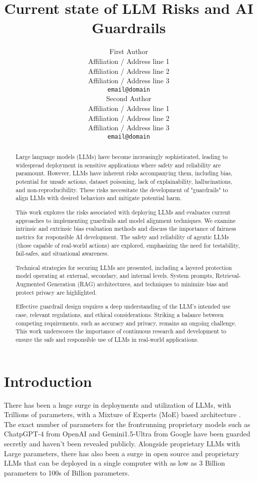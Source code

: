 \documentclass[11pt]{article}
\title{ Current state of LLM Risks and AI Guardrails }
\author{First Author \\
  Affiliation / Address line 1 \\
  Affiliation / Address line 2 \\
  Affiliation / Address line 3 \\
  \texttt{email@domain} \\\And
  Second Author \\
  Affiliation / Address line 1 \\
  Affiliation / Address line 2 \\
  Affiliation / Address line 3 \\
  \texttt{email@domain} \\}
\begin{document}
\maketitle
\begin{abstract}

Large language models (LLMs) have become increasingly sophisticated, leading to widespread deployment in sensitive applications where safety and reliability are paramount.  However, LLMs have inherent risks accompanying them, including bias, potential for unsafe actions, dataset poisoning, lack of explainability, hallucinations, and non-reproducibility. These risks necessitate the development of "guardrails" to align  LLMs with desired behaviors and mitigate potential harm.

This work explores the risks associated with deploying LLMs and evaluates current approaches to implementing guardrails and model alignment techniques. We examine intrinsic and extrinsic bias evaluation methods and discuss the importance of fairness metrics for responsible AI development.  The safety and reliability of agentic LLMs (those capable of real-world actions) are explored, emphasizing the need for testability, fail-safes, and situational awareness.

Technical strategies for securing LLMs are presented, including a layered protection model operating at external, secondary, and internal levels. System prompts, Retrieval-Augmented Generation (RAG) architectures, and techniques to minimize bias and protect privacy are highlighted.

Effective guardrail design requires a deep understanding of the LLM's intended use case, relevant regulations, and ethical considerations. Striking a balance between competing requirements, such as accuracy and privacy, remains an ongoing challenge. This work underscores the importance of continuous research and development to ensure the safe and responsible use of LLMs in real-world applications.

\end{abstract}

\section{Introduction}

There has been a huge surge in deployments and utilization of LLMs, with Trillions of parameters, with a Mixture of Experts (MoE) based architecture \cite{gormley2019mixture} . The exact number of parameters for the frontrunning proprietary models such as ChatpGPT-4 from OpenAI and Gemini1.5-Ultra from Google have been guarded secretly and haven't been revealed publicly. Alongside proprietary LLMs with Large parameters, there has also been a surge in open source and proprietary LLMs that can be deployed in a single computer with as low as 3 Billion parameters to 100s of Billion parameters.
\end{document}
